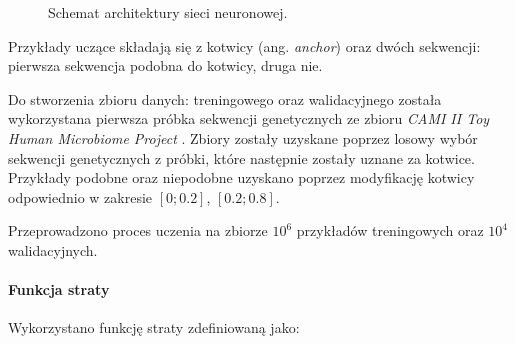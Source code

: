 \begin{figure}[H]
\begin{center}
                        \end{center}
                        \caption{
                            Schemat architektury sieci neuronowej.
                        } 
                        \label{Architektura}
                    \end{figure}
    
                    Przykłady uczące składają się z kotwicy (ang. \textit{anchor}) oraz dwóch sekwencji: pierwsza sekwencja podobna do kotwicy, druga nie.
    
                    Do stworzenia zbioru danych: treningowego oraz walidacyjnego została wykorzystana pierwsza próbka sekwencji genetycznych ze zbioru \textit{CAMI II Toy Human Microbiome Project} \cite{Fritz2019}. Zbiory zostały uzyskane poprzez losowy wybór sekwencji genetycznych z próbki, które następnie zostały uznane za kotwice. Przykłady podobne oraz niepodobne uzyskano poprzez modyfikację kotwicy odpowiednio w zakresie $[0; 0.2]$, $[0.2; 0.8]$.
    
    
                    Przeprowadzono proces uczenia na zbiorze $10^{6}$ przykładów treningowych oraz $10^{4}$ walidacyjnych.
    
                    \paragraph{Funkcja straty}
    
                        Wykorzystano funkcję straty zdefiniowaną jako:
                        
